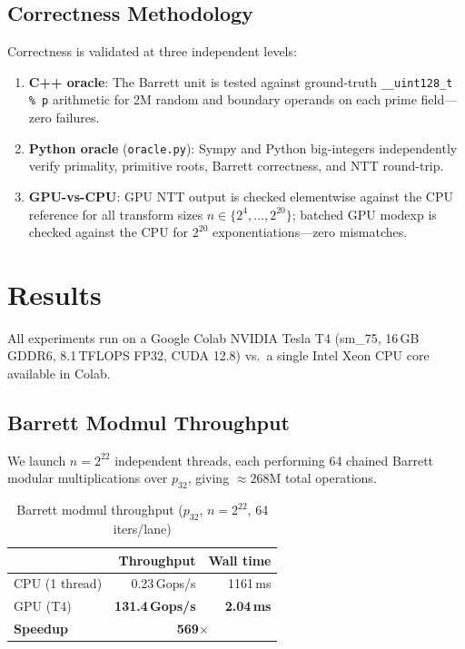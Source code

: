 \documentclass[conference]{IEEEtran}
\begin{document}
\subsection{Correctness Methodology}

Correctness is validated at three independent levels:
\begin{enumerate}
  \item \textbf{C++ oracle}: The Barrett unit is tested against ground-truth \texttt{\_\_uint128\_t
        \% p} arithmetic for 2M random and boundary operands on each prime field—zero failures.
  \item \textbf{Python oracle} (\texttt{oracle.py}): Sympy and Python big-integers independently
        verify primality, primitive roots, Barrett correctness, and NTT round-trip.
  \item \textbf{GPU-vs-CPU}: GPU NTT output is checked elementwise against the CPU reference for
        all transform sizes $n \in \{2^4, \ldots, 2^{20}\}$; batched GPU modexp is checked against
        the CPU for $2^{20}$ exponentiations—zero mismatches.
\end{enumerate}

\section{Results}
\label{sec:results}

All experiments run on a Google Colab NVIDIA Tesla T4 (sm\_75, 16\,GB GDDR6, 8.1\,TFLOPS FP32,
CUDA 12.8) vs.\ a single Intel Xeon CPU core available in Colab.

\subsection{Barrett Modmul Throughput}

We launch $n = 2^{22}$ independent threads, each performing 64 chained Barrett modular
multiplications over $p_{32}$, giving $\approx268\mathrm{M}$ total operations.

\begin{table}[h]
\centering
\caption{Barrett modmul throughput ($p_{32}$, $n{=}2^{22}$, 64 iters/lane)}
\label{tab:modmul}
\begin{tabular}{lrr}
\toprule
 & Throughput & Wall time \\
\midrule
CPU (1 thread) & 0.23\,Gops/s & 1161\,ms \\
GPU (T4) & \textbf{131.4\,Gops/s} & \textbf{2.04\,ms} \\
\midrule
\textbf{Speedup} & \multicolumn{2}{c}{\textbf{569$\times$}} \\
\bottomrule
\end{tabular}
\end{table}
\end{document}

